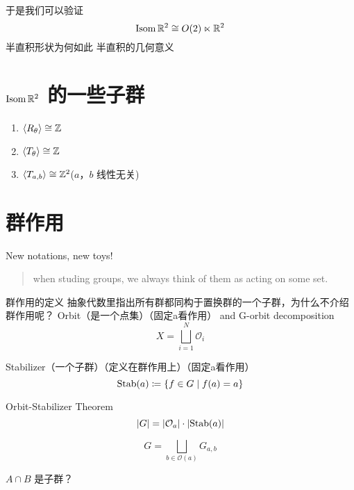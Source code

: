 于是我们可以验证
\[
    \operatorname{\mathrm{Isom}} \mathbb{R}^{2} \cong O(2) \ltimes \mathbb{R}^{2}
\]
半直积形状为何如此
半直积的几何意义

\section{\(\operatorname{\mathrm{Isom}} \mathbb{R}^{2}\) 的一些子群}
\begin{enumerate}
    \item \(\langle R_{\theta} \rangle\cong \mathbb{Z}\)
    \item \(\langle T_{\theta} \rangle\cong \mathbb{Z}\)
    \item \(\langle T_{a,b} \rangle\cong \mathbb{Z}^{2}\)(\(a\)，\(b\) 线性无关)
\end{enumerate}

\section{群作用}
New notations, new toys!

\begin{quote}
    when studing groups, we always think of them as acting
    on some set.
\end{quote}

群作用的定义
抽象代数里指出所有群都同构于置换群的一个子群，为什么不介绍群作用呢？
Orbit（是一个点集）（固定a看作用） and G-orbit decomposition
\[
    X=\bigsqcup_{i=1}^{N} \mathcal{O}_{i}
\]

Stabilizer（一个子群）（定义在群作用上）（固定a看作用）
\[
    \operatorname{\mathrm{Stab}}(a)\coloneq \left\{ f \in G \mid f(a)=a \right\}
\]

Orbit-Stabilizer Theorem
\[
    \left| G \right| = \left| \mathcal{O}_{a} \right| \cdot
    \left| \operatorname{\mathrm{Stab}}(a) \right|
\]

\[
    G= \bigsqcup_{b\in \mathcal{O}(a)} G_{a,b}
\]

\(A\cap B\) 是子群？
